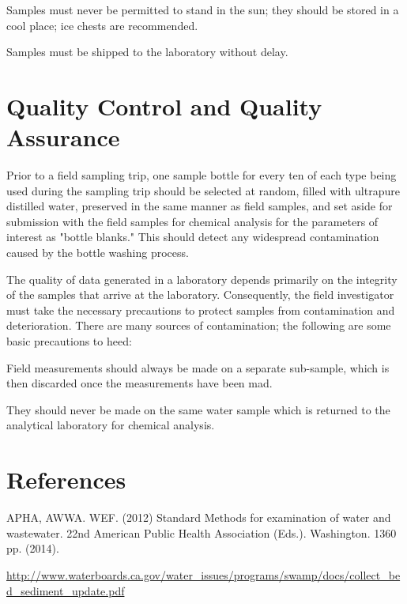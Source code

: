 \documentclass[12pt]{../SOP4_alpha}\usepackage[]{graphicx}\usepackage[]{xcolor}
\begin{document}
\NP Samples must never be permitted to stand in the sun; they should be stored in a cool place; ice chests are recommended. 

\NP Samples must be shipped to the laboratory without delay. 

\section{Quality Control and Quality Assurance}

\NP Prior to a field sampling trip, one sample bottle for every ten of each type being used during the sampling trip should be selected at random, filled with ultrapure distilled water, preserved in the same manner as field samples, and set aside for submission with the field samples for chemical analysis for the parameters of interest as "bottle blanks." This should detect any widespread contamination caused by the bottle washing process.

\NP The quality of data generated in a laboratory depends primarily on the integrity of the samples that arrive at the laboratory. Consequently, the field investigator must take the necessary precautions to protect samples from contamination and deterioration. There are many sources of contamination; the following are some basic precautions to heed: 

\begin{itemize*}
  \item Field measurements should always be made on a separate sub-sample, which is then discarded once the measurements have been mad.
  \item They should never be made on the same water sample which is returned to the analytical laboratory for chemical analysis.
\end{itemize*}

\section{References}

\NP APHA, AWWA. WEF. (2012) Standard Methods for examination of water and wastewater. 22nd American Public Health Association (Eds.). Washington. 1360 pp. (2014).

\NP \url{http://www.waterboards.ca.gov/water_issues/programs/swamp/docs/collect_bed_sediment_update.pdf}
\end{document}
